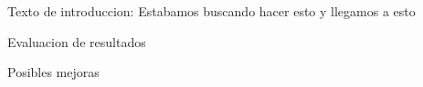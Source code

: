 Texto de introduccion: Estabamos buscando hacer esto y llegamos a esto

Evaluacion de resultados

Posibles mejoras